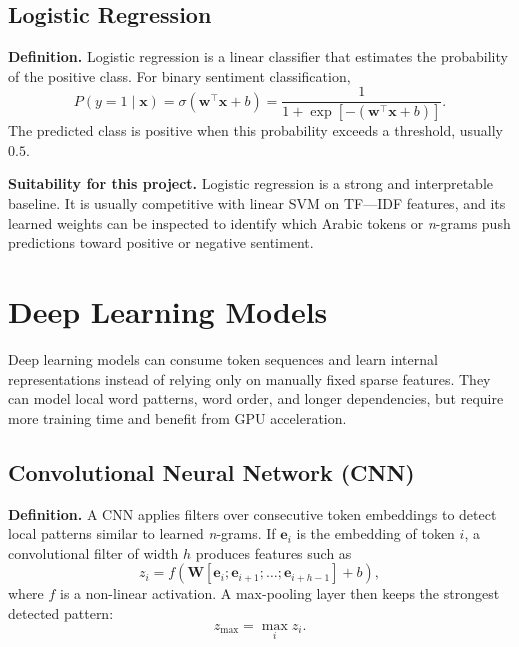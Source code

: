 \documentclass[11pt,a4paper]{report}
\begin{document}
\subsection{Logistic Regression}

\textbf{Definition.} Logistic regression is a linear classifier that estimates the probability of the positive class. For binary sentiment classification,
\begin{equation}
    P(y=1 \mid \mathbf{x})
    =
    \sigma(\mathbf{w}^{\top}\mathbf{x}+b)
    =
    \frac{1}{1+\exp[-(\mathbf{w}^{\top}\mathbf{x}+b)]}.
\end{equation}
The predicted class is positive when this probability exceeds a threshold, usually $0.5$.

\textbf{Suitability for this project.} Logistic regression is a strong and interpretable baseline. It is usually competitive with linear SVM on TF---IDF features, and its learned weights can be inspected to identify which Arabic tokens or \textit{n}-grams push predictions toward positive or negative sentiment.

\section{Deep Learning Models}

Deep learning models can consume token sequences and learn internal representations instead of relying only on manually fixed sparse features. They can model local word patterns, word order, and longer dependencies, but require more training time and benefit from GPU acceleration.

\subsection{Convolutional Neural Network (CNN)}

\textbf{Definition.} A CNN applies filters over consecutive token embeddings to detect local patterns similar to learned \textit{n}-grams. If $\mathbf{e}_i$ is the embedding of token $i$, a convolutional filter of width $h$ produces features such as
\begin{equation}
    z_i = f(\mathbf{W}[\mathbf{e}_i;\mathbf{e}_{i+1};\ldots;\mathbf{e}_{i+h-1}] + b),
\end{equation}
where $f$ is a non-linear activation. A max-pooling layer then keeps the strongest detected pattern:
\begin{equation}
    z_{\max} = \max_i z_i.
\end{equation}
\end{document}
